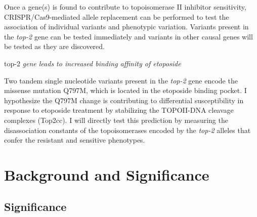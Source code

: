 \documentclass[12pt]{article}
\begin{document}
 Once a gene(s) is found to contribute to topoisomerase II inhibitor sensitivity, CRISPR/Cas9-mediated allele replacement can be performed to test the association of individual variants and phenotypic variation. Variants present in the {\it top-2} gene can be tested immediately and variants in other causal genes will be tested as they are discovered. 
\vspace{15pt}

\vspace{-10pt}

 top-2 {\it gene leads to increased binding affinity of etoposide}
\vspace{10pt}

 Two tandem single nucleotide variants present in the {\it top-2} gene encode the missense mutation Q797M, which is located in the etoposide binding pocket. I hypothesize the Q797M change is contributing to differential susceptibility in response to etoposide treatment by stabilizing the TOPOII-DNA cleavage complexes (Top2cc). I will directly test this prediction by measuring the disassociation constants of the topoisomerases encoded by the {\it top-2} alleles that confer the resistant and sensitive phenotypes.




\newpage






\section{Background and Significance}


\subsection{Significance}
\end{document}
